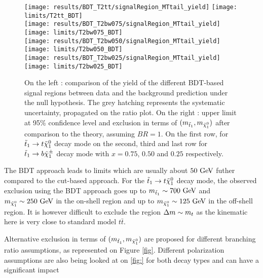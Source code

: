     \begin{figure}[h!]
        \centering
        \texttt{[image: results/BDT\_T2tt/signalRegion\_MTtail\_yield]}
        \texttt{[image: limits/T2tt\_BDT]}\\
        \texttt{[image: results/BDT\_T2bw075/signalRegion\_MTtail\_yield]}
        \texttt{[image: limits/T2bw075\_BDT]}\\
        \texttt{[image: results/BDT\_T2bw050/signalRegion\_MTtail\_yield]}
        \texttt{[image: limits/T2bw050\_BDT]}\\
        \texttt{[image: results/BDT\_T2bw025/signalRegion\_MTtail\_yield]}
        \texttt{[image: limits/T2bw025\_BDT]}\\
        \caption{On the left : comparison of the yield of the different BDT-based signal
        regions between data and the background prediction under the null hypothesis. The
        grey hatching represents the systematic uncertainty, propagated on the ratio plot.
        On the right : upper limit at 95\% confidence level and exclusion in terms of
        $(m_{\tilde{t}_1},m_{\tilde{\chi}_1^0})$ after comparison to the theory, assuming
        $BR = 1$. On the first row, for $\tilde{t}_1 \rightarrow t \tilde{\chi}_1^0$ decay mode on
        the second, third and last row for $\tilde{t}_1 \rightarrow b \tilde{\chi}_1^\pm$ decay mode
        with $x=0.75$, $0.50$ and $0.25$ respectively.}
        \label{fig:resultsBDT}
    \end{figure}

    The BDT approach leads to limits which are usually about $50 ~\text{GeV}$ futher compared to
    the cut-based approach. For the $\tilde{t}_1 \rightarrow t \tilde{\chi}_1^0$ decay mode, the
    observed exclusion using the BDT approach goes up to $m_{\tilde{t}_1} \sim 700 ~\text{GeV}$
    and $m_{\tilde{\chi}_1^0} \sim 250 ~\text{GeV}$ in the on-shell region and up to
    $m_{\tilde{\chi}_1^0} \sim 125 ~\text{GeV}$ in the off-shell region. It is however difficult
    to exclude the region $\Delta m \sim m_{t}$ as the kinematic here is very close to
    standard model $t\bar{t}$.


    Alternative exclusion in terms of $(m_{\tilde{t}_1}, m_{\tilde{\chi}_1^0})$ are proposed
    for different branching ratio assumptions, as represented on Figure \ref{fig}.
    Different polarization assumptions are also being looked at on \ref{fig:} for both
    decay types and can have a significant impact

